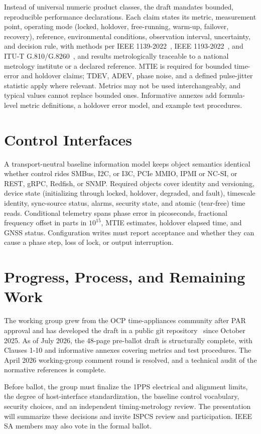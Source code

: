 \documentclass[conference,a4paper]{IEEEtran}
\begin{document}
Instead of universal numeric product classes, the draft mandates bounded,
reproducible performance declarations. Each claim states its metric,
measurement point, operating mode (locked, holdover, free-running, warm-up,
failover, recovery), reference, environmental conditions, observation
interval, uncertainty, and decision rule, with methods per IEEE
1139-2022~\cite{ieee1139}, IEEE 1193-2022~\cite{ieee1193}, and ITU-T
G.810/G.8260~\cite{itug8260}, and results metrologically traceable to a
national metrology institute or a declared reference. MTIE is required for
bounded time-error and holdover claims; TDEV, ADEV, phase noise, and a
defined pulse-jitter statistic apply where relevant. Metrics may not be
used interchangeably, and typical values cannot replace bounded ones.
Informative annexes add formula-level metric definitions, a holdover error
model, and example test procedures.

\section{Control Interfaces}
A transport-neutral baseline information model keeps object semantics
identical whether control rides SMBus, I2C, or I3C, PCIe MMIO, IPMI or
NC-SI, or REST, gRPC, Redfish, or SNMP. Required objects cover identity and
versioning, device state (initializing through locked, holdover, degraded,
and fault), timescale identity, sync-source status, alarms, security state,
and atomic (tear-free) time reads. Conditional telemetry spans phase error
in picoseconds, fractional frequency offset in parts in $10^{15}$, MTIE
estimates, holdover elapsed time, and GNSS status. Configuration writes
must report acceptance and whether they can cause a phase step, loss of
lock, or output interruption.

\section{Progress, Process, and Remaining Work}
The working group grew from the OCP time-appliances community after PAR
approval and has developed the draft in a public git
repository~\cite{p3335repo} since October 2025. As of July 2026, the
48-page pre-ballot draft is structurally complete, with Clauses 1-10 and
informative annexes covering metrics and test procedures. The April 2026
working-group comment round is resolved, and a technical audit of the
normative references is complete.

Before ballot, the group must finalize the 1PPS electrical and alignment
limits, the degree of host-interface standardization, the baseline control
vocabulary, security choices, and an independent timing-metrology review.
The presentation will summarize these decisions and invite ISPCS review
and participation. IEEE SA members may also vote in the formal ballot.



\end{document}
